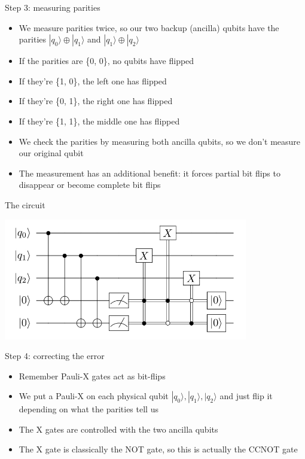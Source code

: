 \documentclass[aspectratio=169, handout]{beamer}
\begin{document}
\begin{frame}{Step 3: measuring parities}
    \begin{itemize}
        \item We measure parities twice, so our two backup (ancilla) qubits have the parities $|q_0\rangle \oplus |q_1\rangle$ and $|q_1\rangle \oplus |q_2\rangle$ \pause
        \item If the parities are \{0, 0\}, no qubits have flipped \pause
        \item If they're \{1, 0\}, the left one has flipped \pause
        \item If they're \{0, 1\}, the right one has flipped \pause
        \item If they're \{1, 1\}, the middle one has flipped \pause
        \item We check the parities by measuring both ancilla qubits, so we don't measure our original qubit \pause
        \item The measurement has an additional benefit: it forces partial bit flips to disappear or become complete bit flips 
    \end{itemize}
\end{frame}

\begin{frame}{The circuit}
\begin{center}
    \includegraphics[width=0.8\textwidth]{bitflipcode.png}\nocite{site:xkcd}
\end{center}
\end{frame}

\begin{frame}{Step 4: correcting the error}
    \begin{itemize}
        \item Remember Pauli-X gates act as bit-flips \pause
        \item We put a Pauli-X on each physical qubit $|q_0\rangle, |q_1\rangle, |q_2\rangle$ and just flip it depending on what the parities tell us \pause
        \item The X gates are controlled with the two ancilla qubits \pause
        \item The X gate is classically the NOT gate, so this is actually the CCNOT gate
    \end{itemize}
\end{frame}
\end{document}
